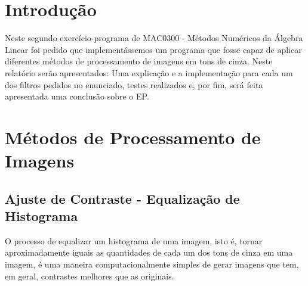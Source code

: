 \documentclass[brazil,times]{abnt}
\begin{document}





\data{\today}

\capa

\folhaderosto

\tableofcontents

\chapter{Introdução\label{cap:introducao}}
	Neste segundo exercício-programa de MAC0300 - Métodos Numéricos da Álgebra Linear foi pedido que implementássemos um programa que fosse capaz de aplicar diferentes métodos de processamento de imagens em tons de cinza. Neste relatório serão apresentados: Uma explicação e a implementação para cada um dos filtros pedidos no enunciado, testes realizados e, por fim, será feita apresentada uma conclusão sobre o EP.



\chapter{Métodos de Processamento de Imagens}

	\section{Ajuste de Contraste - Equalização de Histograma}
		O processo de equalizar um histograma de uma imagem, isto é, tornar aproximadamente iguais as quantidades de cada um dos tons de cinza em uma imagem, é uma maneira computacionalmente simples de gerar imagens que tem, em geral, contrastes melhores que as originais.
\end{document}
